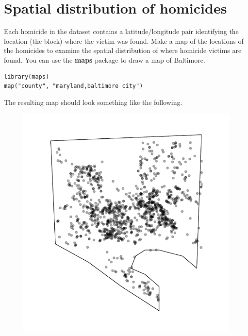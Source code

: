 \documentclass{article}
\begin{document}
\section*{Spatial distribution of homicides}

Each homicide in the dataset contains a latitude/longitude pair identifying the location (the block) where the victim was found. Make a map of the locations of the homicides to examine the spatial distribution of where homicide victims are found. You can use the \textbf{maps} package to draw a map of Baltimore.

\begin{verbatim}
library(maps)
map("county", "maryland,baltimore city")
\end{verbatim}

The resulting map should look something like the following.

\begin{figure}[h]
\includegraphics{homicide-map}
\end{figure}
\end{document}
